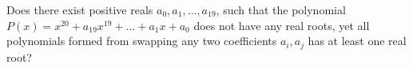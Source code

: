 Does there exist positive reals $a_0, a_1,\ldots ,a_{19}$, such that the polynomial $P(x)=x^{20}+a_{19}x^{19}+\ldots +a_1x+a_0$ does not have any real roots, yet all polynomials formed from swapping any two coefficients $a_i,a_j$ has at least one real root?